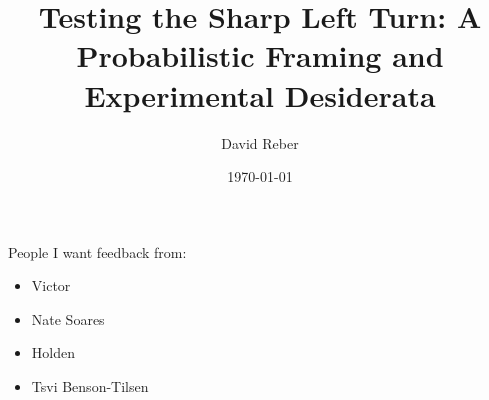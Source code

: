 \documentclass{article}
\title{Testing the Sharp Left Turn: A Probabilistic Framing and Experimental Desiderata}
\author{David Reber}
\date{\today}
\begin{document}
\maketitle



People I want feedback from:
\begin{itemize}
    \item Victor
    \item Nate Soares
    \item Holden
    \item Tsvi Benson-Tilsen
\end{itemize}


\end{document}
